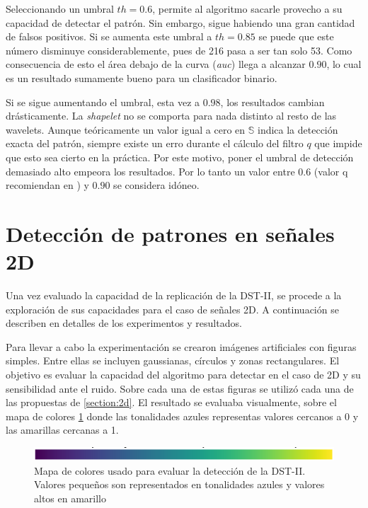 Seleccionando un umbral $th=0.6$, permite al algoritmo sacarle provecho a su capacidad de detectar el patrón. Sin embargo,
sigue habiendo una gran cantidad de falsos positivos. Si se aumenta este umbral a $th=0.85$ se puede que este número
disminuye considerablemente, pues de 216 pasa a ser tan solo 53. Como consecuencia de esto el área debajo de la curva
(\textit{auc}) llega a alcanzar $0.90$, lo cual es un resultado sumamente bueno para un clasificador binario.

Si se sigue aumentando el umbral, esta vez a $0.98$, los resultados cambian drásticamente. La \textit{shapelet} no
se comporta para nada distinto al resto de las wavelets. Aunque teóricamente un valor igual a cero en $\mathbb{S}$ indica
la detección exacta del patrón, siempre existe un erro durante el cálculo del filtro $q$ que impide que esto sea
cierto en la práctica. Por este motivo, poner el umbral de detección demasiado alto empeora los resultados.
Por lo tanto un valor entre $0.6$ (valor q recomiendan en \cite{Guido2018}) y $0.90$ se considera idóneo.

\section{Detección de patrones en señales 2D}

Una vez evaluado la capacidad de la replicación de la DST-II, se procede a la exploración de sus capacidades 
para el caso de señales 2D. A continuación se describen en detalles de los experimentos y resultados.

Para llevar a cabo la experimentación se crearon imágenes artificiales con figuras simples. Entre ellas se incluyen gaussianas,
círculos y zonas rectangulares. El objetivo es evaluar la capacidad del algoritmo para detectar en el caso de 2D
y su sensibilidad ante el ruido. Sobre cada una de estas figuras se utilizó cada una de las propuestas de \ref{section:2d}.
El resultado se evaluaba visualmente, sobre el  mapa de colores \ref{fig:colormap} donde las tonalidades azules representas
valores cercanos a 0 y las amarillas cercanas a 1.

\begin{figure}
	\centering
	\includegraphics[scale=0.8]{Graphics/colormap.png} 
	\caption{Mapa de colores usado para evaluar la detección de la DST-II. Valores pequeños son representados en tonalidades azules y valores altos en amarillo} \label{fig:colormap}
\end{figure}

